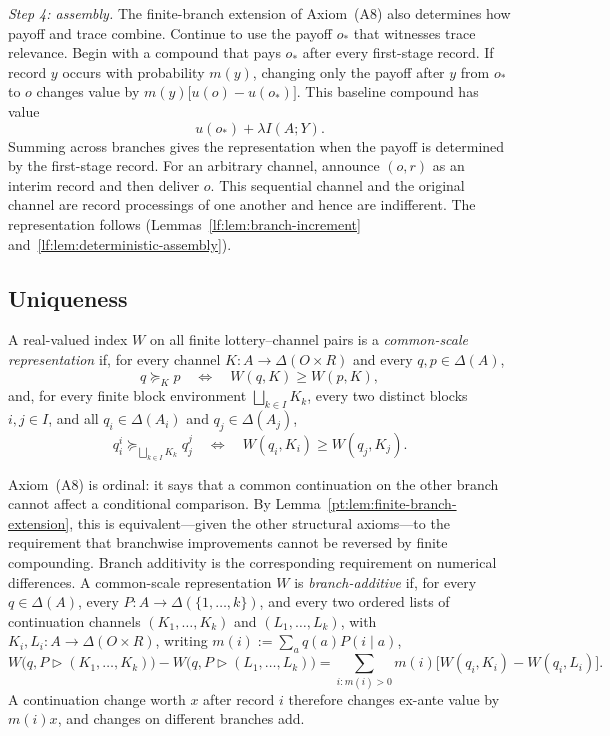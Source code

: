 \documentclass[11pt,a4paper]{article}
\theoremstyle{definition}
\newcommand{\D}{\Delta}
\newcommand{\I}{I}
\newcommand{\1}{\mathbf 1}
\begin{document}
\emph{Step 4: assembly.}  The finite-branch extension of Axiom~\textup{(A8)} also determines how payoff and trace combine.
Continue to use the payoff $o_\ast$ that witnesses trace relevance.  Begin with a compound that pays $o_\ast$
after every first-stage record.  If record $y$ occurs with probability $m(y)$, changing only the payoff after $y$
from $o_\ast$ to $o$ changes value by
$
 m(y)\bigl[u(o)-u(o_\ast)\bigr].
$
This baseline compound has value
\[
 u(o_\ast)+\lambda\I(A;Y).
\]
Summing across branches gives the representation when the payoff is determined by the first-stage record.  For
an arbitrary channel, announce $(o,r)$ as an interim record and then deliver $o$.  This sequential channel and
the original channel are record processings of one another and hence are indifferent.  The representation
follows (Lemmas~\ref{lf:lem:branch-increment} and~\ref{lf:lem:deterministic-assembly}).

\subsection{Uniqueness}

A real-valued index $W$ on all finite lottery--channel pairs is a \emph{common-scale representation} if, for every channel
$K:A\to\D(O\times R)$ and every $q,p\in\D(A)$,
\[
 q\succeq_Kp
 \quad\Longleftrightarrow\quad
 W(q,K)\ge W(p,K),
\]
and, for every finite block environment $\bigsqcup_{k\in I}K_k$, every two distinct blocks $i,j\in I$, and all
$q_i\in\D(A_i)$ and $q_j\in\D(A_j)$,
\[
 q_i^i\succeq_{\bigsqcup_{k\in I}K_k}q_j^j
 \quad\Longleftrightarrow\quad
 W(q_i,K_i)\ge W(q_j,K_j).
\]

Axiom~\textup{(A8)} is ordinal: it says that a common continuation on the other branch cannot affect a conditional
comparison.  By Lemma~\ref{pt:lem:finite-branch-extension}, this is equivalent---given the other structural
axioms---to the requirement that branchwise improvements cannot be reversed by finite compounding.  Branch
additivity is the corresponding requirement on numerical differences.  A common-scale representation $W$
is \emph{branch-additive} if, for every $q\in\D(A)$, every $P:A\to\D(\{1,\ldots,k\})$, and every
two ordered lists of continuation channels $(K_1,\ldots,K_k)$ and $(L_1,\ldots,L_k)$, with
$K_i,L_i:A\to\D(O\times R)$, writing
$m(i):=\sum_aq(a)P(i\mid a)$,
\begin{equation}
 W\bigl(q,P\triangleright(K_1,\ldots,K_k)\bigr)
 -W\bigl(q,P\triangleright(L_1,\ldots,L_k)\bigr)
 =\sum_{i:m(i)>0}m(i)
 \bigl[W(q_i,K_i)-W(q_i,L_i)\bigr].
 \label{eq:branch-additive-index}
\end{equation}
A continuation change worth $x$ after record $i$ therefore changes ex-ante value by $m(i)x$, and changes on
different branches add. 
\end{document}
